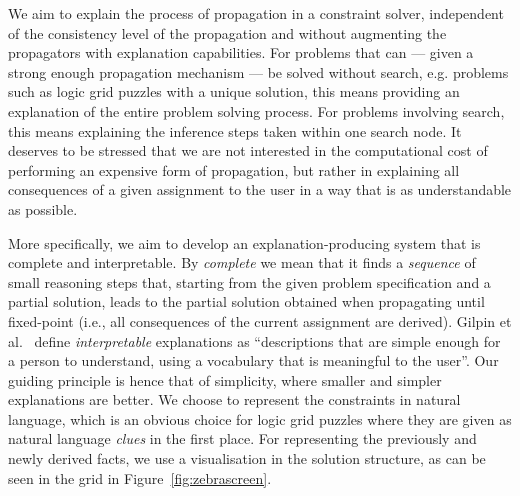We aim to explain the process of propagation in a constraint solver, independent of the consistency level of the propagation and without augmenting the propagators with explanation capabilities.
For problems that can --- given a strong enough propagation mechanism --- be solved without search, e.g. problems such as logic grid puzzles with a unique solution, this means providing an explanation of the entire problem solving process. For problems involving search, this means explaining the inference steps taken within one search node. 
It deserves to be stressed that we are not interested in the computational cost of performing an expensive form of propagation, but rather in explaining all consequences of a given assignment to the user in a way that is as understandable as possible. 

More specifically, we aim to develop an explanation-producing system that is complete and interpretable. By \textit{complete} we mean that it finds a \textit{sequence} of small reasoning steps that, starting from the given problem specification and a partial solution, leads to the partial solution obtained when propagating until fixed-point (i.e., all consequences of the current assignment are derived). %
%
Gilpin et al.~\cite{DBLP:conf/dsaa/GilpinBYBSK18} define \textit{interpretable} explanations as ``descriptions that are simple enough for a person to understand, using a vocabulary that is meaningful to the user''. Our guiding principle is hence that of simplicity, where smaller and simpler explanations are better. %
We choose to represent the constraints in natural language, which is an obvious choice for logic grid puzzles where they are given as natural language \textit{clues} in the first place. For representing the previously and newly derived facts, we use a visualisation in the solution structure, as can be seen in the grid in Figure~\ref{fig:zebrascreen}.


